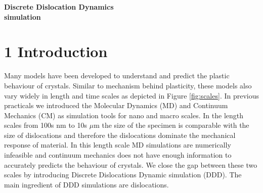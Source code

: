 

\begin{flushleft}
    {\Huge \textbf{Discrete Dislocation Dynamics}} \\[0.2cm]
    {\Huge \textbf{simulation}}
\end{flushleft}

\section*{1 Introduction}

Many models have been developed to understand and predict the plastic behaviour of crystals. Similar to mechanism behind plasticity, these models also vary widely in length and time scales as depicted in Figure \ref{fig:scales}. In previous practicals we introduced the Molecular Dynamics (MD) and Continuum Mechanics (CM) as simulation tools for nano and macro scales. In the length scales from 100s nm to 10s $\mu$m the size of the specimen is comparable with the size of dislocations and therefore the dislocations dominate the mechanical response of material. In this length scale MD simulations are numerically infeasible and continuum mechanics does not have enough information to accurately predicts the behaviour of crystals. We close the gap between these two scales by introducing Discrete Dislocations Dynamic simulation (DDD). The main ingredient of DDD simulations are dislocations.


